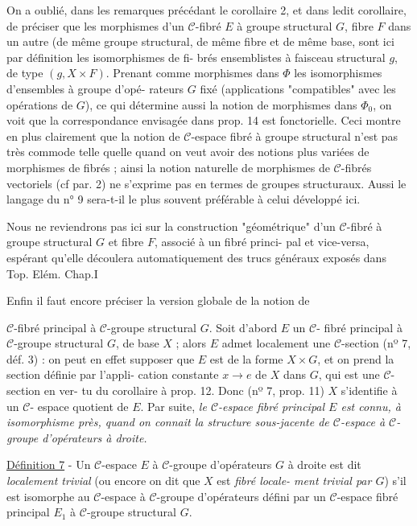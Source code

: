 On a oublié, dans les remarques précédant le corollaire 2, et dans
ledit corollaire, de préciser que les morphismes d'un $\mathcal{C}$-fibré $E$ à groupe
structural $G$, fibre $F$ dans un autre (de même groupe structural, de même
fibre et de même base, sont ici par définition les isomorphismes de fi-
brés ensemblistes à faisceau structural $g$, de type $(g, X \times F)$. Prenant
comme morphismes dans $\Phi$ les isomorphismes d'ensembles à groupe d'opé-
rateurs $G$ fixé (applications "compatibles" avec les opérations de $G$),
ce qui détermine aussi la notion de morphismes dans $\Phi_0$, on voit que la
correspondance envisagée dans prop. 14 est fonctorielle. Ceci montre en
plus clairement que la notion de $\mathcal{C}$-espace fibré à groupe structural
n'est pas très commode telle quelle quand on veut avoir des notions
plus variées de morphismes de fibrés ; ainsi la notion naturelle de
morphismes de $\mathcal{C}$-fibrés vectoriels (cf par. 2) ne s'exprime pas en
termes de groupes structuraux. Aussi le langage du n° 9 sera-t-il le
plus souvent préférable à celui développé ici.

Nous ne reviendrons pas ici sur la construction "géométrique" d'un
$\mathcal{C}$-fibré à groupe structural $G$ et fibre $F$, associé à un fibré princi-
pal et vice-versa, espérant qu'elle découlera automatiquement des trucs
généraux exposés dans Top. Elém. Chap.I

Enfin il faut encore préciser la version globale de la notion de

\newpage



$\mathcal{C}$-fibré principal à $\mathcal{C}$-groupe structural $G$. Soit d'abord $E$ un $\mathcal{C}$-
fibré principal à $\mathcal{C}$-groupe structural $G$, de base $X$ ; alors $E$ admet
localement une $\mathcal{C}$-section (nº 7, déf. 3) : on peut en effet supposer
que $E$ est de la forme $X \times G$, et on prend la section définie par l'appli-
cation constante $x \to e$ de $X$ dans $G$, qui est une $\mathcal{C}$-section en ver-
tu du corollaire à prop. 12. Donc (nº 7, prop. 11) $X$ s'identifie à un $\mathcal{C}$-
espace quotient de $E$. Par suite, \emph{le $\mathcal{C}$-espace fibré principal $E$ est
connu, à isomorphisme près, quand on connait la structure sous-jacente
de $\mathcal{C}$-espace à $\mathcal{C}$-groupe d'opérateurs à droite.}

\underline{Définition 7} - Un $\mathcal{C}$-espace $E$ à $\mathcal{C}$-groupe d'opérateurs $G$ à droite
est dit \emph{localement trivial} (ou encore on dit que $X$ est \emph{fibré locale-
ment trivial par $G$}) s'il est isomorphe au $\mathcal{C}$-espace à $\mathcal{C}$-groupe
d'opérateurs défini par un $\mathcal{C}$-espace fibré principal $E_1$ à $\mathcal{C}$-groupe
structural $G$.

